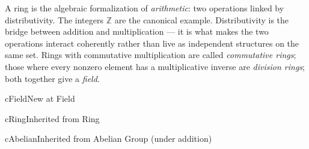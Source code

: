 \begin{remark}
  A ring is the algebraic formalization of \emph{arithmetic}: two operations
  linked by distributivity.  The integers $\mathbb{Z}$ are the canonical
  example.  Distributivity is the bridge between addition and multiplication —
  it is what makes the two operations interact coherently rather than live as
  independent structures on the same set.  Rings with commutative multiplication
  are called \emph{commutative rings}; those where every nonzero element has a
  multiplicative inverse are \emph{division rings}; both together give a
  \emph{field}.
\end{remark}



\clearpage\thispagestyle{plain}

\begin{bpnew}{cField}{New at Field}
\end{bpnew}

\begin{bpinh}{cRing}{Inherited from Ring}
\end{bpinh}

\begin{bpinh}{cAbelian}{Inherited from Abelian Group (under addition)}
\end{bpinh}

